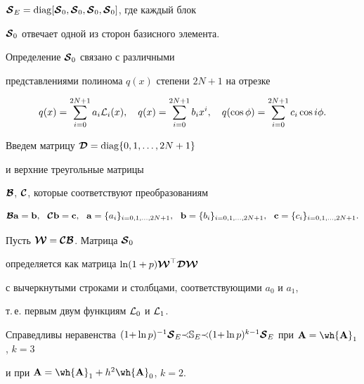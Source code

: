 $\bi{\cal S}_E=\diag[ \bi{\cal S}_0, \bi{\cal S}_0,


\bi{\cal S}_0, \bi{\cal S}_0 ]$, где каждый блок


$\boldsymbol {\cal S}_0$ отвечает одной из сторон базисного элемента.


Определение $\boldsymbol {\cal S}_0$ связано с различными


представлениями полинома $q(x)$ степени $2N+1$ на отрезке


$$


q(x)=\sum_{i=0}^{2N+1} a_i {\cal L}_i(x),\quad q(x)=


\sum_{i=0}^{2N+1} b_i x^i, \quad


q(\cos\phi)=\sum_{i=0}^{2N+1} c_i \cos i\phi.


$$


Введем матрицу $\boldsymbol {\cal D}=\operatorname{diag}\{0,1,\dotsc, 2N+1\}$ 


и верхние треугольные матрицы


$\boldsymbol {\cal B}$, $\boldsymbol {\cal C} $, которые соответствуют преобразованиям


$$


\bi{\cal B}{\bold a}={\bold b},\ \ \bi{\cal C}{\bold b}=


{\bold c},\ \ {\bold a}=\{a_i\}_{i=0,1,\dotsc,2N+1},


\ \ {\bold b}=\{b_i\}_{i=0,1,\dotsc,2N+1}, \ \ {\bold


c}=\{c_i\}_{i=0,1,\dotsc,2N+1}.


$$


Пусть $\boldsymbol {\cal W}=\boldsymbol {\cal C}\boldsymbol {\cal B}$. Матрица $\boldsymbol {\cal S}_0$ 


определяется как матрица $\ln(1+p)\boldsymbol {\cal W}^\top \boldsymbol {\cal D} \boldsymbol {\cal W}$


с вычеркнутыми строками и столбцами, соответствующими $a_0$ и $a_1$,


т.\,е. первым двум функциям ${\cal L}_0$ и ${\cal L}_1$.





\begin{thms}


\label{TeorSE}


Справедливы неравенства $(1{+}\ln p)^{-1}\bi{\cal S}_ E {\prec}


{\Bbb{S}}_E{\prec}(1{+}\ln p)^{k-1}


\bi{\cal S}_ E$ при ${\bold A}=\wh{{\bold A}}_1$, $k=3$


и при ${\bold A}=\wh{{\bold A}}_1 + h^2\wh{{\bold A}}_0$, $k=2$.


\end{thms}





